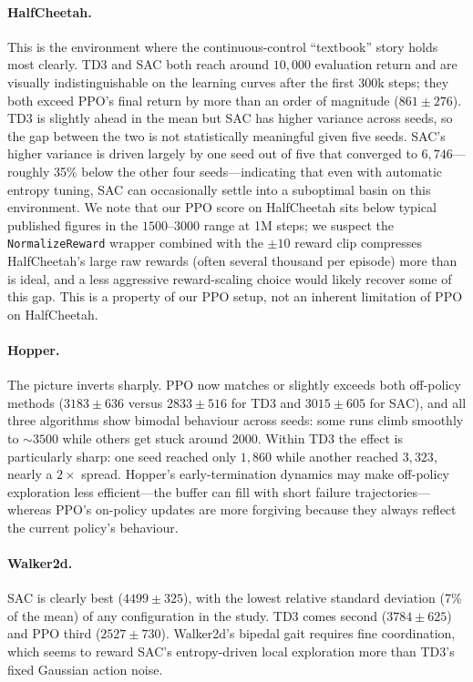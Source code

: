 \documentclass[letterpaper]{article}
\begin{document}
\paragraph{HalfCheetah.}
This is the environment where the continuous-control ``textbook'' story
holds most clearly. TD3 and SAC both reach around
$10{,}000$ evaluation return and are visually indistinguishable on the
learning curves after the first 300k steps; they both exceed PPO's final
return by more than an order of magnitude ($861 \pm 276$). TD3 is slightly
ahead in the mean but SAC has higher variance across seeds, so the gap
between the two is not statistically meaningful given five seeds.
SAC's higher variance is driven largely by one seed out of five that
converged to $6{,}746$---roughly 35\% below the other four seeds---indicating
that even with automatic entropy tuning, SAC can occasionally settle into a
suboptimal basin on this environment.
We note that our PPO score on HalfCheetah sits below typical published
figures in the $1500$--$3000$ range at 1M steps; we suspect the
\texttt{NormalizeReward} wrapper combined with the $\pm 10$ reward clip
compresses HalfCheetah's large raw rewards (often several thousand per
episode) more than is ideal, and a less aggressive reward-scaling choice
would likely recover some of this gap. This is a property of our PPO setup,
not an inherent limitation of PPO on HalfCheetah.

\paragraph{Hopper.}
The picture inverts sharply. PPO now matches or slightly exceeds both
off-policy methods ($3183 \pm 636$ versus $2833 \pm 516$ for TD3 and
$3015 \pm 605$ for SAC), and all three algorithms show bimodal behaviour
across seeds: some runs climb smoothly to $\sim\!3500$ while others get
stuck around 2000.
Within TD3 the effect is particularly sharp: one seed reached only
$1{,}860$ while another reached $3{,}323$, nearly a $2\times$ spread.
Hopper's early-termination dynamics may make
off-policy exploration less efficient---the buffer can fill with short
failure trajectories---whereas PPO's on-policy updates are more forgiving
because they always reflect the current policy's behaviour.

\paragraph{Walker2d.}
SAC is clearly best ($4499 \pm 325$), with the lowest relative standard
deviation (7\% of the mean) of any configuration in the study. TD3 comes second ($3784 \pm 625$) and PPO
third ($2527 \pm 730$). Walker2d's bipedal gait requires fine coordination,
which seems to reward SAC's entropy-driven local exploration more than
TD3's fixed Gaussian action noise.
\end{document}
